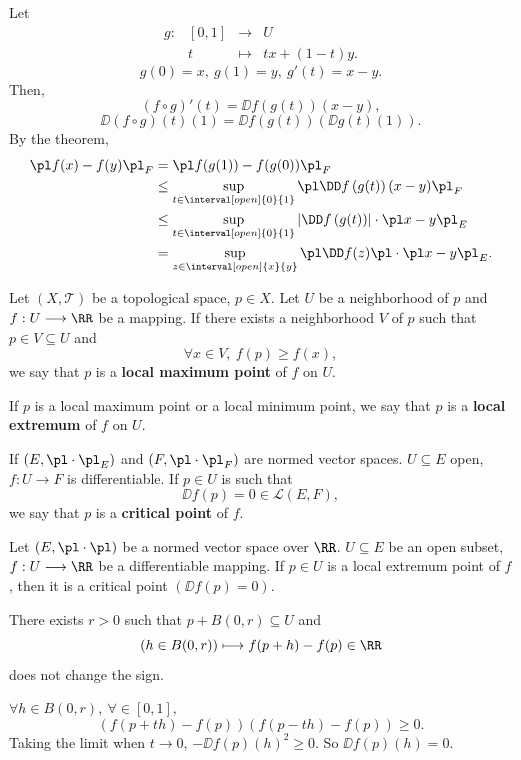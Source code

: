 \begin{proofenv}
    Let 
    $$\begin{array}{rrcl}
        g:&[0,1]&\longrightarrow& U\\
        &t&\longmapsto& tx+(1-t)y.
    \end{array}$$
    $$g(0)=x,\ g(1)=y,\ g'(t)=x-y.$$
    Then, 
    $$\left(f\circ g\right)'(t)=\DD f\left(g(t)\right)\left(x-y\right),$$
    $$\DD \left(f\circ g\right)(t)(1)=\DD f\left(g(t)\right)\left(\DD g(t)(1)\right).$$
    By the theorem, 
    \begin{align*}
        \pl f(x)-f(y)\pl_F&= \pl f(g(1))-f(g(0))\pl_F\\
        &\le \sup_{t\in \interval[open]{0}{1}}\pl \DD f\left(g(t)\right)(x-y)\pl_F\\
        &\le \sup_{t\in \interval[open]{0}{1}}\left|\DD f\left(g(t)\right)\right|\cdot \pl x-y\pl_E\\
        &=\sup_{z\in \interval[open]{x}{y}}\pl \DD f(z)\pl\cdot \pl x-y\pl_E.
    \end{align*}

\end{proofenv}
\begin{definitionenv}
    Let $(X,\mathscr{T})$  be a topological space, $p\in X$. Let $U$ be a neighborhood of $p$ and $f: U\longrightarrow \RR$ be a mapping. If there exists a neighborhood $V$ of $p$ such that $p\in V\subseteq U$ and 
    $$\forall x\in V,\ f(p)\ge f(x),$$
    we say that $p$ is a \textbf{local maximum point} of $f$ on $U$.

    \quad If $p$ is a local maximum point or a local minimum point, we say that $p$ is a \textbf{local extremum} of $f$ on $U$.

    \quad If $(E,\pl\cdot\pl_E)$ and $(F,\pl \cdot\pl_F)$ are normed vector spaces. $U\subseteq E$ open, $f:U\rightarrow F$ is differentiable. If $p\in U$ is such that
    $$\DD f(p)=0\in \mathscr{L}(E,F),$$ 
    we say that $p$ is a \textbf{critical point} of $f$.
\end{definitionenv}
\begin{theoremenv}
    Let $(E,\pl\cdot\pl)$ be a normed vector space over $\RR$. $U\subseteq E$ be an open subset, $f:U\longrightarrow \RR$ be a differentiable mapping. If $p\in U$ is a local extremum point of $f$, then  it is a critical point $(\DD f(p)=0)$.
\end{theoremenv}
\begin{proofenv}
    There exists $r>0$ such that $p+B(0,r)\subseteq U$ and 
    $$\left(h\in B(0,r)\right)\longmapsto f(p+h)- f(p)\in \RR$$
    does not change the sign.

    $\forall h\in B(0,r),\ \forall \in [0,1],$
    $$\left(f(p+th)-f(p)\right)\left(f(p-th)-f(p)\right)\ge 0.$$
    Taking the limit when $t\rightarrow 0$, $-\DD f(p)(h)^2\ge 0$. So $\DD f(p)(h)=0.$
\end{proofenv}
